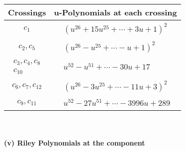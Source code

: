 \documentclass[1p]{elsarticle_modified}
\theoremstyle{definition}
\begin{document}
\begin{tabular}{m{50pt}|m{274pt}}
Crossings & \hspace{64pt}u-Polynomials at each crossing \\
\hline $$\begin{aligned}c_{1}\end{aligned}$$&$\begin{aligned}
&(u^{26}+15 u^{25}+\cdots+3 u+1)^{2}
\end{aligned}$\\
\hline $$\begin{aligned}c_{2},c_{5}\end{aligned}$$&$\begin{aligned}
&(u^{26}- u^{25}+\cdots- u+1)^{2}
\end{aligned}$\\
\hline $$\begin{aligned}c_{3},c_{4},c_{8}\\c_{10}\end{aligned}$$&$\begin{aligned}
&u^{52}- u^{51}+\cdots-30 u+17
\end{aligned}$\\
\hline $$\begin{aligned}c_{6},c_{7},c_{12}\end{aligned}$$&$\begin{aligned}
&(u^{26}-3 u^{25}+\cdots-11 u+3)^{2}
\end{aligned}$\\
\hline $$\begin{aligned}c_{9},c_{11}\end{aligned}$$&$\begin{aligned}
&u^{52}-27 u^{51}+\cdots-3996 u+289
\end{aligned}$\\
\hline
\end{tabular}\\~\\
\newpage\renewcommand{\arraystretch}{1}
\flushleft \textbf{(v) Riley Polynomials at the component}\newline \\
\end{document}
